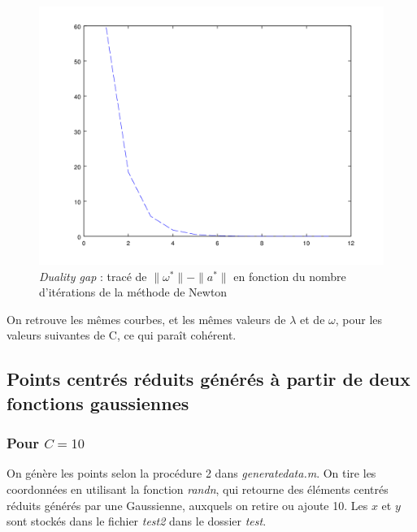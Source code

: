 \documentclass{article}
\begin{document}
         \begin{figure}
           \begin{center}
             \subfigure\includegraphics[scale=0.5]{images/dualitygap1.png}
             \caption{\emph{Duality gap} : tracé de $\|\omega^*\| - \|a^*\|$ en fonction du nombre d'itérations de la méthode de Newton}
           \end{center}
         \end{figure}

On retrouve les mêmes courbes, et les mêmes valeurs de $\lambda$ et de $\omega$, pour les valeurs suivantes de C, ce qui paraît cohérent.

\subsection{Points centrés réduits générés à partir de deux fonctions gaussiennes}

\subsubsection{Pour $C = 10$}

On génère les points selon la procédure 2 dans \emph{generatedata.m}. On tire les coordonnées en utilisant la fonction \emph{randn}, qui retourne des éléments centrés réduits générés par une Gaussienne, auxquels on retire ou ajoute 10. Les $x$ et $y$ sont stockés dans le fichier \emph{test2} dans le dossier \emph{test}.
\end{document}
